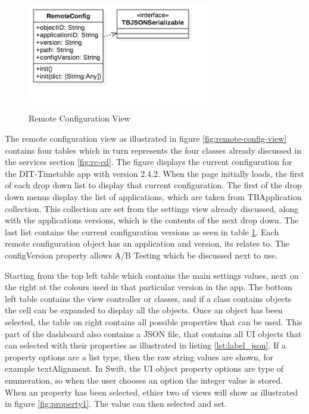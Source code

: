\begin{figure}[!h]
    \caption{Remote Configuration View}
    \centering
    \includegraphics[width=80mm]{images/classdiagrams/RemoteConfig}
    \label{fig:remote-config-cd}
\end{figure} 

The remote configuration view as illustrated in figure \ref{fig:remote-config-view} contains four tables which in turn represents the four classes already discussed in the services section \ref{fig:rc-cd}. The figure displays the current configuration for the DIT-Timetable app with version 2.4.2. When the page initially loads, the first of each drop down list to display that current configuration. The first of the drop down menus display the list of applications, which are taken from TBApplication collection. This collection are set from the settings view already discussed, along with the applications versions, which is the contents of the next drop down. The last list contains the current configuration versions as seen in table \ref{fig:remote-config-cd}. Each remote configuration object has an application and version, its relates to. The configVersion property allows A/B Testing which be discussed next to use. 

Starting from the top left table which contains the main settings values, next on the right at the colours used in that particular version in the app. The bottom left table contains the view controller or classes, and if a class contains objects the cell can be expanded to display all the objects. Once an object has been selected, the table on right contains all possible properties that can be used. This part of the dashboard also contains a JSON file, that contains all UI objects that can selected with their properties as illustrated in listing \ref{lst:label_json}. If a property options are a list type, then the raw string values are shown, for example textAlignment. In Swift, the UI object property options are type of enumeration, so when the user chooses an option the integer value is stored. When an property has been selected, ethier two of views will show as illustrated in figure \ref{fig:property1}. The value can then selected and set.


